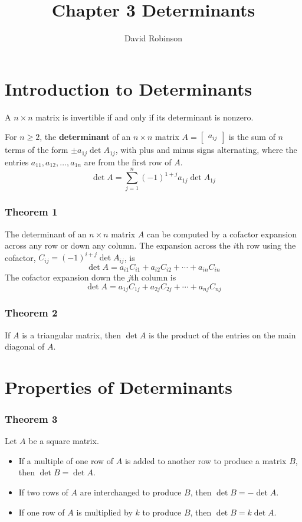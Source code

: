 \documentclass{article}
\title{Chapter 3 Determinants}
\author{David Robinson}
\date{}
\begin{document}
\maketitle

\section*{Introduction to Determinants}
A $n\times n$ matrix is invertible if and only if its determinant is nonzero.

For $n\geq 2$, the \textbf{determinant} of an $n\times n$ matrix $A=\begin{bmatrix}a_{ij}\end{bmatrix}$ is the sum of $n$ terms of the form $\pm a_{1j} \det A_{1j}$, with plus and minus signs alternating, where the entries $a_{11}, a_{12},\ldots , a_{1n}$ are from the first row of $A$.
\[\det A=\sum_{j=1}^{n}{(-1)}^{1+j}a_{1j}\det A_{1j}\]

\subsubsection*{Theorem 1}
The determinant of an $n\times n$ matrix $A$ can be computed by a cofactor expansion across any row or down any column. The expansion across the $i$th row using the cofactor, $C_{ij}={(-1)}^{i+j}\det A_{ij}$, is
\[\det A=a_{i1}C_{i1}+a_{i2}C_{i2}+\cdots +a_{in}C_{in}\]
The cofactor expansion down the $j$th column is
\[\det A=a_{1j}C_{1j}+a_{2j}C_{2j}+\cdots +a_{nj}C_{nj}\]

\subsubsection*{Theorem 2}
If $A$ is a triangular matrix, then $\det A$ is the product of the entries on the main diagonal of $A$.

\pagebreak

\section*{Properties of Determinants}
\subsubsection*{Theorem 3}
Let $A$ be a square matrix.
\begin{itemize}
    \item If a multiple of one row of $A$ is added to another row to produce a matrix $B$, then $\det B = \det A$.
    \item If two rows of $A$ are interchanged to produce $B$, then $\det B = -\det A$.
    \item If one row of $A$ is multiplied by $k$ to produce $B$, then $\det B = k \det A$.
\end{itemize}
\end{document}
